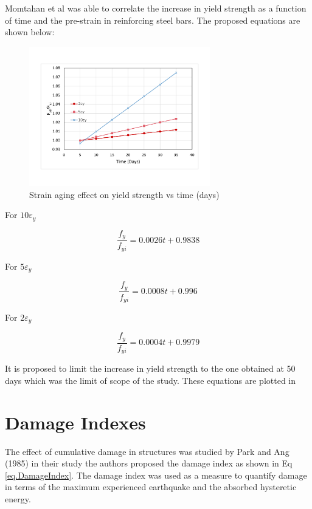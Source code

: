Momtahan et al was able to correlate the increase in yield strength as a function of time and the pre-strain in reinforcing steel bars. The proposed equations are shown below:

\begin{figure}[htbp]
\centering
\includegraphics[width=0.7\textwidth]{Chapter-2/figs/StrainAging_TimeDependent}
\caption{Strain aging effect on yield strength vs time (days)}
\label{fig:hist4}
\end{figure}

For $10\varepsilon_y$

\begin{equation}
  \frac{f_y}{f_{yi}}=0.0026t+0.9838
  \label{eq.twelve}
\end{equation} 

For $5\varepsilon_y$

\begin{equation}
  \frac{f_y}{f_{yi}}=0.0008t+0.996
  \label{eq.thirteen}
\end{equation} 

For $2\varepsilon_y$

\begin{equation}
  \frac{f_y}{f_{yi}}=0.0004t+0.9979
  \label{eq.fourteen}
\end{equation} 

It is proposed to limit the increase in yield strength to the one obtained at 50 days which was the limit of scope of the study. These equations are plotted in 

\section{Damage Indexes}
The effect of cumulative damage in structures was studied by Park and Ang (1985) \cite{Young-JiPark1985} in their study the authors proposed the damage index as shown in Eq \ref{eq.DamageIndex}. The damage index was used as a measure to quantify damage in terms of the maximum experienced earthquake and the absorbed hysteretic energy.

